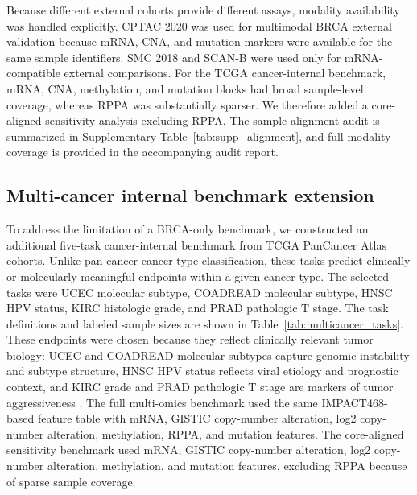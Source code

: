 Because different external cohorts provide different assays, modality availability was handled explicitly. CPTAC 2020 was used for multimodal BRCA external validation because mRNA, CNA, and mutation markers were available for the same sample identifiers. SMC 2018 and SCAN-B were used only for mRNA-compatible external comparisons. For the TCGA cancer-internal benchmark, mRNA, CNA, methylation, and mutation blocks had broad sample-level coverage, whereas RPPA was substantially sparser. We therefore added a core-aligned sensitivity analysis excluding RPPA. The sample-alignment audit is summarized in Supplementary Table~\ref{tab:supp_alignment}, and full modality coverage is provided in the accompanying audit report.

\subsection{Multi-cancer internal benchmark extension}

To address the limitation of a BRCA-only benchmark, we constructed an additional five-task cancer-internal benchmark from TCGA PanCancer Atlas cohorts. Unlike pan-cancer cancer-type classification, these tasks predict clinically or molecularly meaningful endpoints within a given cancer type. The selected tasks were UCEC molecular subtype, COADREAD molecular subtype, HNSC HPV status, KIRC histologic grade, and PRAD pathologic T stage. The task definitions and labeled sample sizes are shown in Table~\ref{tab:multicancer_tasks}. These endpoints were chosen because they reflect clinically relevant tumor biology: UCEC and COADREAD molecular subtypes capture genomic instability and subtype structure, HNSC HPV status reflects viral etiology and prognostic context, and KIRC grade and PRAD pathologic T stage are markers of tumor aggressiveness \cite{tcga_ucec_2013,tcga_coadread_2012,tcga_hnsc_2015,tcga_kirc_2013,tcga_prad_2015,hoadley_pancancer_2018}. The full multi-omics benchmark used the same IMPACT468-based feature table with mRNA, GISTIC copy-number alteration, log2 copy-number alteration, methylation, RPPA, and mutation features. The core-aligned sensitivity benchmark used mRNA, GISTIC copy-number alteration, log2 copy-number alteration, methylation, and mutation features, excluding RPPA because of sparse sample coverage.

\begin{table}[ht]
\centering
\caption{Cancer-internal tasks added to the benchmark.}
\label{tab:multicancer_tasks}
\end{table}

